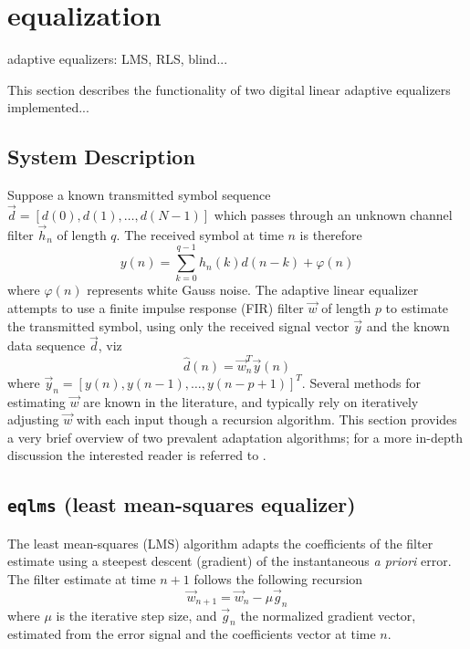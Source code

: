 % 
%

\newpage
\section{equalization}
\label{module:equalization}
adaptive equalizers: LMS, RLS, blind...

This section describes the functionality of two digital linear adaptive
equalizers implemented...

\subsection{System Description}
\label{module:equalization:system}
Suppose a known transmitted symbol sequence
$\vec{d} = [ d(0), d(1), \ldots ,d(N-1) ]$
which passes through an unknown channel filter $\vec{h}_n$ of length
$q$.
The received symbol at time $n$ is therefore
%
\begin{equation}
    y(n) = \sum\limits_{k=0}^{q-1}{h_n(k)d(n-k)} + \varphi(n)
\end{equation}
%
where $\varphi(n)$ represents white Gauss noise.
The adaptive linear equalizer attempts to use a finite impulse response (FIR)
filter $\vec{w}$ of length $p$ to estimate the transmitted symbol, using only
the received signal vector $\vec{y}$ and the known data sequence $\vec{d}$,
viz
\[
    \hat{d}(n) = \vec{w}_n^T \vec{y}(n)
\]
where $\vec{y}_n = [ y(n), y(n-1),\ldots, y(n-p+1) ]^T$.
Several methods for estimating $\vec{w}$ are known in the literature, and
typically rely on iteratively adjusting $\vec{w}$ with each input though a
recursion algorithm.
This section provides a very brief overview of two prevalent adaptation
algorithms;
for a more in-depth discussion the interested reader is referred to
\cite{Proakis:2001,Haykin:2002}.

\subsection{{\tt eqlms} (least mean-squares equalizer)}
\label{module:equalization:eqlms}
The least mean-squares (LMS) algorithm adapts the coefficients of the filter
estimate using a steepest descent (gradient) of the instantaneous {\it a priori}
error.
The filter estimate at time $n+1$ follows the following recursion
\begin{equation}
\label{eq:lms:weight_update}
\vec{w}_{n+1} = \vec{w}_{n} - \mu \vec{g}_n
\end{equation}
where $\mu$ is the iterative step size, and
$\vec{g}_n$ the normalized gradient vector, estimated from the error signal
and the coefficients vector at time $n$.

